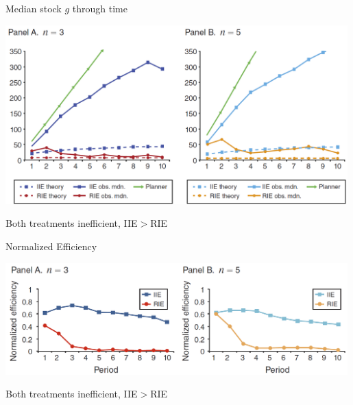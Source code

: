 \documentclass{beamer}
\begin{document}
\begin{frame}{Median stock $g$ through time}
\begin{card}
    \begin{center}
        \includegraphics[width=0.99\textwidth]{./i/BNPfig1.png}
    \end{center}
\end{card}

\begin{card}
 Both treatments inefficient, IIE$>$RIE
\end{card}
\end{frame}

\begin{frame}{Normalized Efficiency}
\begin{card}
    \begin{center}
        \includegraphics[width=0.99\textwidth]{./i/BNPfig2.png}
    \end{center}
\end{card}

\begin{card}
 Both treatments inefficient, IIE$>$RIE
\end{card}
\end{frame}
\end{document}
